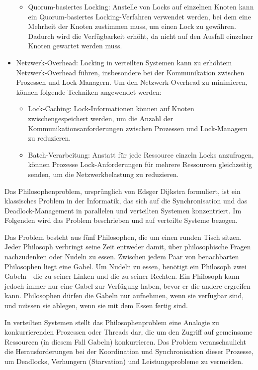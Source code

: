 \begin{itemize}
\begin{itemize}
\item Quorum-basiertes Locking: Anstelle von Locks auf einzelnen Knoten kann ein Quorum-basiertes Locking-Verfahren verwendet werden, bei dem eine Mehrheit der Knoten zustimmen muss, um einen Lock zu gewähren. Dadurch wird die Verfügbarkeit erhöht, da nicht auf den Ausfall einzelner Knoten gewartet werden muss.
\end{itemize}
\item Netzwerk-Overhead: Locking in verteilten Systemen kann zu erhöhtem Netzwerk-Overhead führen, insbesondere bei der Kommunikation zwischen Prozessen und Lock-Managern. Um den Netzwerk-Overhead zu minimieren, können folgende Techniken angewendet werden:
\begin{itemize}
\item Lock-Caching: Lock-Informationen können auf Knoten zwischengespeichert werden, um die Anzahl der Kommunikationsanforderungen zwischen Prozessen und Lock-Managern zu reduzieren.
\item Batch-Verarbeitung: Anstatt für jede Ressource einzeln Locks anzufragen, können Prozesse Lock-Anforderungen für mehrere Ressourcen gleichzeitig senden, um die Netzwerkbelastung zu reduzieren.
\end{itemize}
\end{itemize}

Das Philosophenproblem, ursprünglich von Edsger Dijkstra formuliert, ist ein klassisches Problem in der Informatik, das sich auf die Synchronisation und das Deadlock-Management in parallelen und verteilten Systemen konzentriert. Im Folgenden wird das Problem beschrieben und auf verteilte Systeme bezogen.

Das Problem besteht aus fünf Philosophen, die um einen runden Tisch sitzen. Jeder Philosoph verbringt seine Zeit entweder damit, über philosophische Fragen nachzudenken oder Nudeln zu essen. Zwischen jedem Paar von benachbarten Philosophen liegt eine Gabel. Um Nudeln zu essen, benötigt ein Philosoph zwei Gabeln - die zu seiner Linken und die zu seiner Rechten. Ein Philosoph kann jedoch immer nur eine Gabel zur Verfügung haben, bevor er die andere ergreifen kann. Philosophen dürfen die Gabeln nur aufnehmen, wenn sie verfügbar sind, und müssen sie ablegen, wenn sie mit dem Essen fertig sind.

In verteilten Systemen stellt das Philosophenproblem eine Analogie zu konkurrierenden Prozessen oder Threads dar, die um den Zugriff auf gemeinsame Ressourcen (in diesem Fall Gabeln) konkurrieren. Das Problem veranschaulicht die Herausforderungen bei der Koordination und Synchronisation dieser Prozesse, um Deadlocks, Verhungern (Starvation) und Leistungsprobleme zu vermeiden.

